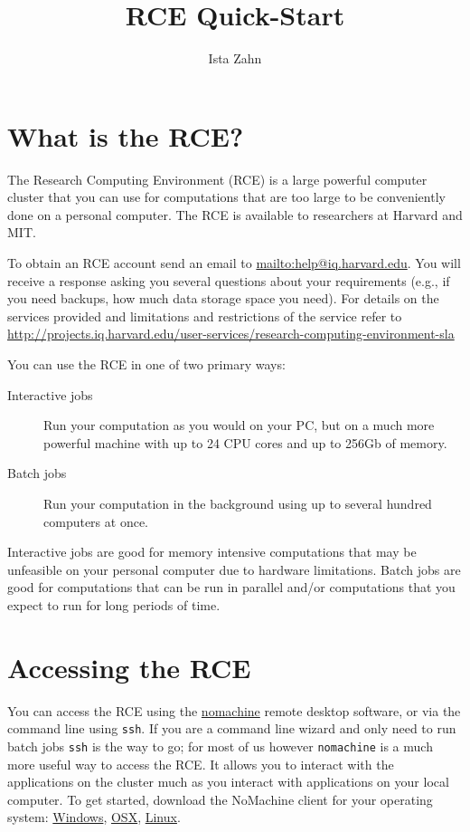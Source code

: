 \documentclass[11pt]{article}
\author{Ista Zahn}
\date{}
\title{RCE Quick-Start}
\begin{document}
\maketitle
\tableofcontents


\section{What is the RCE?}
\label{sec-1}
The Research Computing Environment (RCE) is a large powerful computer cluster that you can use for computations that are too large to be conveniently done on a personal computer. The RCE is available to researchers at Harvard and MIT. 

To obtain an RCE account send an email to \url{mailto:help@iq.harvard.edu}. You will receive a response asking you several questions about your requirements (e.g., if you need backups, how much data storage space you need). For details on the services provided and limitations and restrictions of the service refer to \url{http://projects.iq.harvard.edu/user-services/research-computing-environment-sla}

You can use the RCE in one of two primary ways:
\begin{description}
\item[{Interactive jobs}] Run your computation as you would on your PC, but on a much more powerful machine with up to 24 CPU cores and up to 256Gb of memory.
\item[{Batch jobs}] Run your computation in the background using up to several hundred computers at once.
\end{description}

Interactive jobs are good for memory intensive computations that may be unfeasible on your personal computer due to hardware limitations. Batch jobs are good for computations that can be run in parallel and/or computations that you expect to run for long periods of time.


\section{Accessing the RCE}
\label{sec-2}
You can access the RCE using the \href{http://projects.iq.harvard.edu/rce/nx4_installation}{nomachine} remote desktop software, or via the command line using \texttt{ssh}. If you are a command line wizard and only need to run batch jobs \texttt{ssh} is the way to go; for most of us however \texttt{nomachine} is a much more useful way to access the RCE. It allows you to interact with the applications on the cluster much as you interact with applications on your local computer. To get started, download the NoMachine client for your operating system: \href{http://downloads.hmdc.harvard.edu/nx/4/nomachine-client-windows-latest.zip}{Windows}, \href{http://downloads.hmdc.harvard.edu/nx/4/nomachine-client-osx-latest.dmg}{OSX}, \href{http://downloads.hmdc.harvard.edu/nx/4/nomachine-client-linux-latest.zip}{Linux}. 
\end{document}
